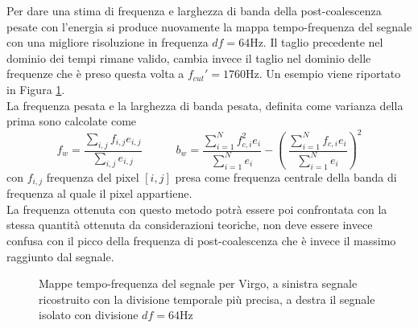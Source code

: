 Per dare una stima di frequenza e larghezza di banda della post-coalescenza pesate con l'energia si produce nuovamente la mappa tempo-frequenza del segnale con una migliore risoluzione in frequenza $df=64$Hz. Il taglio precedente nel dominio dei tempi rimane valido, cambia invece il taglio nel dominio delle frequenze che è preso questa volta a $f_{cut}' = 1760$Hz. Un esempio viene riportato in Figura \ref{fig:time_freq_pm}.\\
La frequenza pesata e la larghezza di banda pesata, definita come varianza della prima sono calcolate come 
\begin{equation}
f_w=\frac{\sum_{i,j}f_{i,j}e_{i,j}}{\sum_{i,j}e_{i,j}}
\quad\quad\quad
b_w =\frac{\sum_{i=1}^Nf_{c,i}^2e_i}{\sum_{i=1}^Ne_i} - \left(\ \frac{\sum_{i=1}^Nf_{c,i}e_i}{\sum_{i=1}^Ne_i}\right)^2
\end{equation}
con $f_{i,j}$ frequenza del pixel $[i,j]$ presa come frequenza centrale della banda di frequenza al quale il pixel appartiene.\\
La frequenza ottenuta con questo metodo potrà essere poi confrontata con la stessa quantità ottenuta da considerazioni teoriche, non deve essere invece confusa con il picco della frequenza di post-coalescenza che è invece il massimo raggiunto dal segnale.
\begin{figure}[hbt!]
	\centering
	\quad\quad
	\caption{Mappe tempo-frequenza del segnale per Virgo, a sinistra segnale ricostruito con la divisione temporale più precisa, a destra il segnale isolato con divisione $df = 64$Hz}
	\label{fig:time_freq_pm}
\end{figure}

